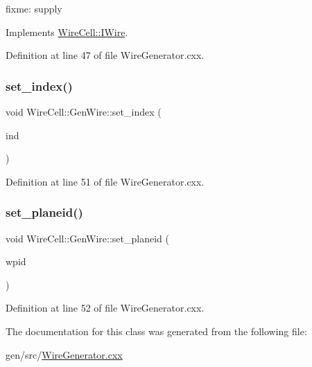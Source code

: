 fixme\+: supply 



Implements \hyperlink{class_wire_cell_1_1_i_wire_a8628e5620e63e66790635b59ed8076ce}{Wire\+Cell\+::\+I\+Wire}.



Definition at line 47 of file Wire\+Generator.\+cxx.

\mbox{\label{class_wire_cell_1_1_gen_wire_a792eed6c415ceb057cd4f248bdc5e512}} 
\subsubsection{\texorpdfstring{set\+\_\+index()}{set\_index()}}
{\footnotesize\ttfamily void Wire\+Cell\+::\+Gen\+Wire\+::set\+\_\+index (\begin{DoxyParamCaption}\item[{int}]{ind }\end{DoxyParamCaption})\hspace{0.3cm}{\ttfamily [inline]}}



Definition at line 51 of file Wire\+Generator.\+cxx.

\mbox{\label{class_wire_cell_1_1_gen_wire_a66c7d91a5646e440a492f785e7bc868d}} 
\subsubsection{\texorpdfstring{set\+\_\+planeid()}{set\_planeid()}}
{\footnotesize\ttfamily void Wire\+Cell\+::\+Gen\+Wire\+::set\+\_\+planeid (\begin{DoxyParamCaption}\item[{\hyperlink{class_wire_cell_1_1_wire_plane_id}{Wire\+Plane\+Id}}]{wpid }\end{DoxyParamCaption})\hspace{0.3cm}{\ttfamily [inline]}}



Definition at line 52 of file Wire\+Generator.\+cxx.



The documentation for this class was generated from the following file\+:\begin{DoxyCompactItemize}
\item 
gen/src/\hyperlink{_wire_generator_8cxx}{Wire\+Generator.\+cxx}\end{DoxyCompactItemize}
